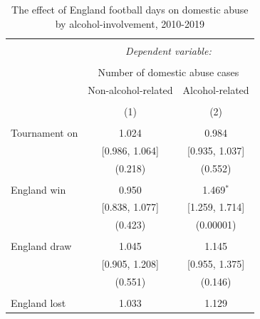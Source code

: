 \documentclass[12pt, a4paper]{article}
\begin{document}



\begin{table}[!htbp] \centering
  \begin{threeparttable}
  \caption{The effect of England football days on domestic abuse by alcohol-involvement, 2010-2019}
  \label{coremodel}
\begin{tabular}{@{\extracolsep{5pt}}lcc}
\\[-1.8ex]\hline
\hline \\[-1.8ex]
 & \multicolumn{2}{c}{\textit{Dependent variable:}} \\
\cline{2-3}
\\[-1.8ex] & \multicolumn{2}{c}{Number of domestic abuse cases} \\
 & Non-alcohol-related & Alcohol-related\\
\\[-1.8ex] & (1) & (2)\\
\hline \\[-1.8ex]
 Tournament on & 1.024 & 0.984 \\
  & [0.986, 1.064] & [0.935, 1.037] \\
  & (0.218) & (0.552) \\
  & & \\
 England win & 0.950 & 1.469$^{*}$ \\
  & [0.838, 1.077] & [1.259, 1.714] \\
  & (0.423) & (0.00001) \\
  & & \\
 England draw & 1.045 & 1.145 \\
  & [0.905, 1.208] & [0.955, 1.375] \\
  & (0.551) & (0.146) \\
  & & \\
 England lost & 1.033 & 1.129 \\

\end{tabular}
\end{threeparttable}
\end{table}
\end{document}
